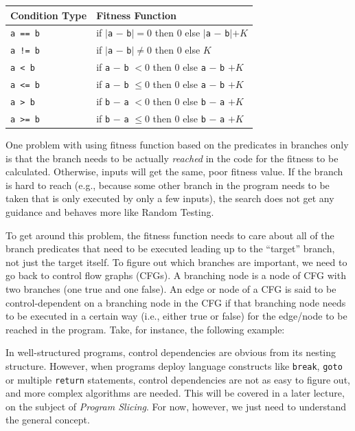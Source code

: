\begin{center}
    \begin{tabular}{ll}
        \toprule
        {\bf Condition Type} & {\bf Fitness Function} \\
        \midrule
        {\tt a == b} & if $|${\tt a} $-$ {\tt b}$| = 0$ then $0$ else $|${\tt a} $-$ {\tt b}$| + K$ \\
        {\tt a != b} & if $|${\tt a} $-$ {\tt b}$| \neq 0$ then $0$ else $K$ \\
        {\tt a < b}  & if {\tt a} $-$ {\tt b} $< 0$ then $0$ else {\tt a} $-$ {\tt b} $+ K$ \\
        {\tt a <= b} & if {\tt a} $-$ {\tt b} $\leq 0$ then $0$ else {\tt a} $-$ {\tt b} $+ K$ \\
        {\tt a > b}  & if {\tt b} $-$ {\tt a} $< 0$ then $0$ else {\tt b} $-$ {\tt a} $+ K$ \\
        {\tt a >= b} & if {\tt b} $-$ {\tt a} $\leq 0$ then $0$ else {\tt b} $-$ {\tt a} $+ K$ \\
        \bottomrule
    \end{tabular}
\end{center}    
    
One problem with using fitness function based on the predicates in branches
only is that the branch needs to be actually {\it reached} in the code for the fitness
to be calculated. Otherwise, inputs will get the same, poor fitness value. If
the branch is hard to reach (e.g., because some other branch in the program
needs to be taken that is only executed by only a few inputs), the search does
not get any guidance and behaves more like Random Testing.

To get around this problem, the fitness function needs to care about all of the
branch predicates that need to be executed leading up to the ``target'' branch,
not just the target itself. To figure out which branches are important, we need
to go back to control flow graphs (CFGs). A branching node is a node of CFG with
two branches (one true and one false). An edge or node of a CFG is said to be
control-dependent on a branching node in the CFG if that branching node needs to
be executed in a certain way (i.e., either true or false) for the edge/node to
be reached in the program. Take, for instance, the following example:

In well-structured programs, control dependencies are obvious from its nesting
structure. However, when programs deploy language constructs like {\tt break},
{\tt goto} or multiple {\tt return} statements, control dependencies are not as
easy to figure out, and more complex algorithms are needed. This will be
covered in a later lecture, on the subject of {\it Program Slicing}. For now,
however, we just need to understand the general concept. 


